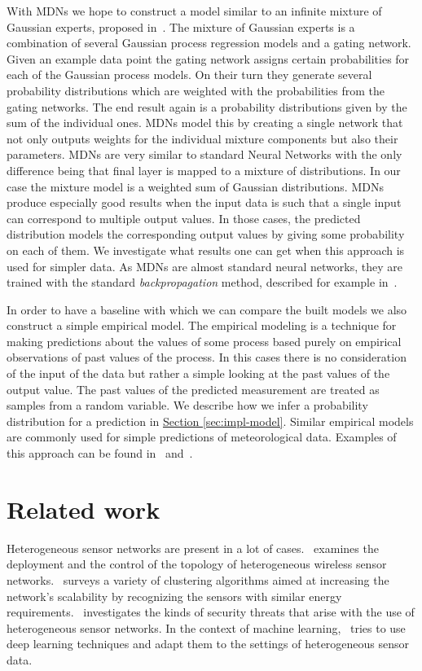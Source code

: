 \documentclass[12pt,a4paper,twoside]{scrartcl}
\numberwithin{equation}{section}
\newcommand{\refsec}[1]{\hyperref[#1]{Section \ref*{#1}}}
\begin{document}
With MDNs we hope to construct a model similar to an infinite mixture of Gaussian experts, proposed in~\cite{rasmussen2002}. The mixture of Gaussian experts is a combination of several Gaussian process regression models and a gating network. Given an example data point the gating network assigns certain probabilities for each of the Gaussian process models. On their turn they generate several probability distributions which are weighted with the probabilities from the gating networks. The end result again is a probability distributions given by the sum of the individual ones. MDNs model this by creating a single network that not only outputs weights for the individual mixture components but also their parameters. MDNs are very similar to standard Neural Networks with the only difference being that final layer is mapped to a mixture of distributions. In our case the mixture model is a weighted sum of Gaussian distributions. MDNs produce especially good results when the input data is such that a single input can correspond to multiple output values. In those cases, the predicted distribution models the corresponding output values by giving some probability on each of them. We investigate what results one can get when this approach is used for simpler data. As MDNs are almost standard neural networks, they are trained with the standard \emph{backpropagation} method, described for example in~\cite{bertels2001}.

In order to have a baseline with which we can compare the built models we also construct a simple empirical model. The empirical modeling is a technique for making predictions about the values of some process based purely on empirical observations of past values of the process. In this cases there is no consideration of the input of the data but rather a simple looking at the past values of the output value. The past values of the predicted measurement are treated as samples from a random variable. We describe how we infer a probability distribution for a prediction in \refsec{sec:impl-model}. Similar empirical models are commonly used for simple predictions of meteorological data. Examples of this approach can be found in~\cite{krueger2011} and~\cite{eden2015}.
\section{Related work}\label{sec:related-work}
Heterogeneous sensor networks are present in a lot of cases.~\cite{wu2007} examines the deployment and the control of the topology of heterogeneous wireless sensor networks.~\cite{katiyar2010} surveys a variety of clustering algorithms aimed at increasing the network's scalability by recognizing the sensors with similar energy requirements.~\cite{uplap2014} investigates the kinds of security threats that arise with the use of heterogeneous sensor networks. In the context of machine learning,~\cite{liu2017} tries to use deep learning techniques and adapt them to the settings of heterogeneous sensor data.
\end{document}

